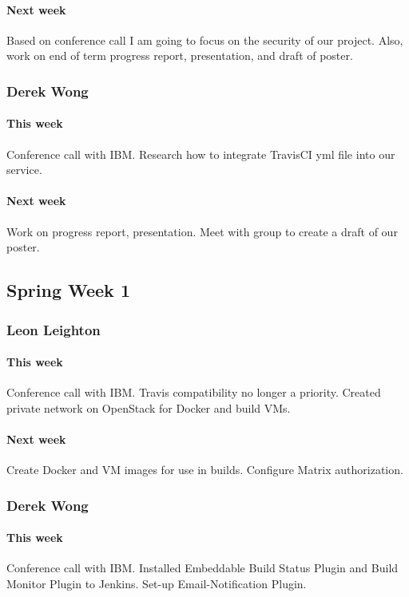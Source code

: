 \documentclass[10pt,letterpaper,onecolumn,draftclsnofoot]{IEEEtran}
\begin{document}
\paragraph{Next week} Based on conference call I am going to focus on the security of our project.  
Also, work on end of term progress report, presentation, and draft of poster.


\subsubsection{Derek Wong}
\paragraph{This week}Conference call with IBM\@.
Research how to integrate TravisCI yml file into our service.

\paragraph{Next week}Work on progress report, presentation.            
Meet with group to create a draft of our poster.

\subsection{Spring Week 1}
\subsubsection{Leon Leighton}
\paragraph{This week}Conference call with IBM. Travis compatibility no longer a priority.
Created private network on OpenStack for Docker and build VMs.
\paragraph{Next week}Create Docker and VM images for use in builds.
Configure Matrix authorization.

\subsubsection{Derek Wong}
\paragraph{This week}Conference call with IBM.     
Installed Embeddable Build Status Plugin and Build Monitor Plugin to Jenkins.   
Set-up Email-Notification Plugin.
\end{document}
